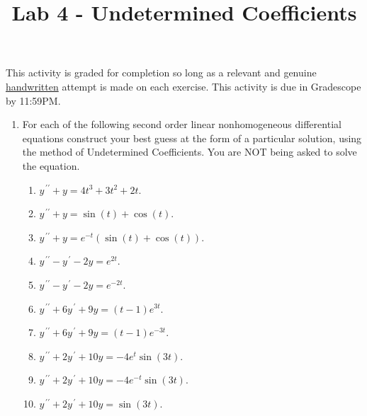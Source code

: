\documentclass{ximera}
\begin{document}
\begin{abstract}
 \end{abstract}

    \title{Lab 4 - Undetermined Coefficients }
    
    \maketitle

This activity is graded for completion so long as a relevant and genuine \underline{handwritten} attempt is made on each exercise.  This activity is due in Gradescope by 11:59PM.


\begin{enumerate}
\item  For each of the following second order linear nonhomogeneous differential equations construct your best guess at the form of a particular solution, using the method of Undetermined Coefficients.  You are NOT being asked to solve the equation.
\begin{enumerate}
\item $y^{\,\prime\prime}+y=4t^3+3t^2+2t$.
\vfill

\item $y^{\,\prime\prime}+y=\sin (t)+\cos (t)$.
\vfill


\item $y^{\,\prime\prime}+y=e^{-t}(\sin (t)+\cos (t))$.
\vfill

\item $y^{\,\prime\prime}-y^{\,\prime}-2y=e^{2t}$.
\vfill

\item $y^{\,\prime\prime}-y^{\,\prime}-2y=e^{-2t}$.
\vfill

\item $y^{\,\prime\prime}+6y^{\,\prime}+9y=(t-1)e^{3t}$.
\vfill

\item $y^{\,\prime\prime}+6y^{\,\prime}+9y=(t-1)e^{-3t}$.
\vfill

\item  $y^{\,\prime\prime}+2y^{\,\prime}+10y=-4e^{t}\sin{(3t)}$.\\
\vfill

\item  $y^{\,\prime\prime}+2y^{\,\prime}+10y=-4e^{-t}\sin{(3t)}$.\\
\vfill

\item $y^{\,\prime\prime}+2y^{\,\prime}+10y=\sin{(3t)}$.\\
\vfill


\end{enumerate}
\end{enumerate}
\end{document}
